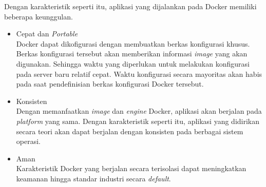     Dengan karakteristik seperti itu, aplikasi yang dijalankan pada Docker memiliki beberapa keunggulan.
    \begin{itemize}
        \item Cepat dan \textit{Portable} \\
            Docker dapat dikofigurasi dengan membuatkan berkas konfigurasi khusus. Berkas konfigurasi tersebut akan memberikan informasi \textit{image} yang akan digunakan. Sehingga waktu yang diperlukan untuk melakukan konfigurasi pada server baru relatif cepat. Waktu konfigurasi secara mayoritas akan habis pada saat pendefinisian berkas konfigurasi Docker tersebut.
            
        \item Konsisten \\
            Dengan memanfaatkan \textit{image} dan \textit{engine} Docker, aplikasi akan berjalan pada \textit{platform} yang sama. Dengan karakteristik seperti itu, aplikasi yang didirikan secara teori akan dapat berjalan dengan konsisten pada berbagai sistem operasi.
            
        \item Aman \\
            Karakteristik Docker yang berjalan secara terisolasi dapat meningkatkan keamanan hingga standar industri\cite{docker:what-is-container} secara \textit{default}.
    \end{itemize}
    